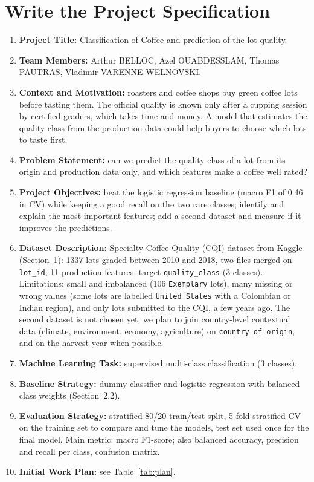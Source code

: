 \documentclass{article}
\begin{document}
\section{Write the Project Specification}

\begin{enumerate}
  \item \textbf{Project Title:} Classification of Coffee and prediction of the lot quality.
  \item \textbf{Team Members:} Arthur BELLOC, Azel OUABDESSLAM, Thomas PAUTRAS, Vladimir VARENNE-WELNOVSKI.
  \item \textbf{Context and Motivation:} roasters and coffee shops buy green coffee lots before tasting them. The official quality is known only after a cupping session by certified graders, which takes time and money. A model that estimates the quality class from the production data could help buyers to choose which lots to taste first.
  \item \textbf{Problem Statement:} can we predict the quality class of a lot from its origin and production data only, and which features make a coffee well rated?
  \item \textbf{Project Objectives:} beat the logistic regression baseline (macro F1 of 0.46 in CV) while keeping a good recall on the two rare classes; identify and explain the most important features; add a second dataset and measure if it improves the predictions.
  \item \textbf{Dataset Description:} Specialty Coffee Quality (CQI) dataset from Kaggle (Section~1): 1337 lots graded between 2010 and 2018, two files merged on \texttt{lot\_id}, 11 production features, target \texttt{quality\_class} (3 classes). Limitations: small and imbalanced (106 \texttt{Exemplary} lots), many missing or wrong values (some lots are labelled \texttt{United States} with a Colombian or Indian region), and only lots submitted to the CQI, a few years ago. The second dataset is not chosen yet: we plan to join country-level contextual data (climate, environment, economy, agriculture) on \texttt{country\_of\_origin}, and on the harvest year when possible.
  \item \textbf{Machine Learning Task:} supervised multi-class classification (3 classes).
  \item \textbf{Baseline Strategy:} dummy classifier and logistic regression with balanced class weights (Section~2.2).
  \item \textbf{Evaluation Strategy:} stratified 80/20 train/test split, 5-fold stratified CV on the training set to compare and tune the models, test set used once for the final model. Main metric: macro F1-score; also balanced accuracy, precision and recall per class, confusion matrix.
  \item \textbf{Initial Work Plan:} see Table~\ref{tab:plan}.
\end{enumerate}
\end{document}
